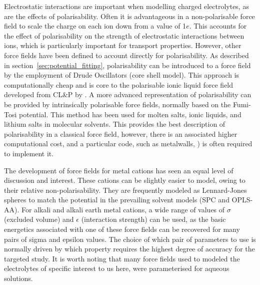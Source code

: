\documentclass[../main.tex]{subfiles}
\begin{document}
Electrostatic interactions are important when modelling charged electrolytes, as are the effects of polarisability. Often it is advantageous in a non-polarisable force field to scale the charge on each ion down from a value of 1$e$.\cite{schroder_comparing_2012, schroder_polarizable_2020, shimizu_structural_2015} This accounts for the effect of polarisability on the strength of electrostatic interactions between ions, which is particularly important for transport properties. However, other force fields have been defined to account directly for polarisability.\cite{schroder_polarizable_2020} As described in section~\ref{sec:potential_fitting}, polarisability can be introduced to a force field by the employment of Drude Oscillators (core shell model).\cite{schroder_polarizable_2020, schroder_comparing_2012, lindahl_gromacs_2021} This approach is computationally cheap and is core to the polarisable ionic liquid force field developed from CL\&P by \citeauthor{schroder_comparing_2012}. \cite{schroder_comparing_2012} A more advanced representation of polarisability can be provided by intrinsically polarisable force fields, normally based on the Fumi-Tosi potential. \cite{sangster1976interionic} This method has been used for molten salts,\cite{madden_covalent_1996} ionic liquids, \cite{borodin_polarizable_2009, schroder_polarizable_2020} and lithium salts in molecular solvents.\cite{borodin_litfsi_2006,bedrov_molecular_2019,bedrov_influence_2010} This provides the best description of polarisability in a classical force field, however, there is an associated higher computational cost, and a particular code, such as metalwalls, \cite{marin-lafleche_metalwalls_2020}) is often required to implement it.

The development of force fields for metal cations has seen an equal level of discussion and interest. These cations can be slightly easier to model, owing to their relative non-polarisability.\cite{mamatkulov_force_2013,mamatkulov_force_2018,schroder_polarizable_2020} They are frequently modeled as Lennard-Jones spheres to match the potential in the prevailing solvent models (SPC and OPLS-AA). For alkali and alkali earth metal cations, a wide range of values of $\sigma$ (excluded volume) and $\epsilon$ (interaction strength) can be used, as the basic energetics associated with one of these force fields can be recovered for many pairs of sigma and epsilon values. The choice of which pair of parameters to use is normally driven by which property requires the highest degree of accuracy for the targeted study. \cite{mamatkulov_force_2013} It is worth noting that many force fields used to modeled the electrolytes of specific interest to us here, were parameterised for aqueous solutions.\cite{mamatkulov_force_2013}
\end{document}
